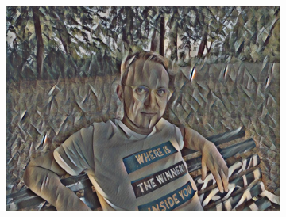 \begin{figure}[H]
\begin{subfigure}[h]{0.32\textwidth}
        \includegraphics[width=\textwidth]{resources/content/experiments/ich-vgg16_still_life_with_liqueur_bottle.jpg}
    \end{subfigure}




\end{figure}
